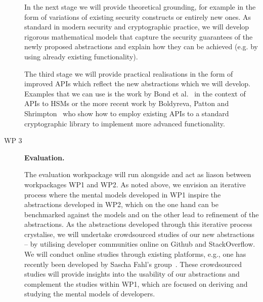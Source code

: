 \documentclass[10pt]{article}
\begin{document}
\begin{description}
In the next stage we will provide theoretical grounding, for example in the form of variations of existing security constructs or entirely new ones.  As standard in modern security and cryptographic practice, we will develop rigorous mathematical models that capture the security guarantees of the newly proposed abstractions and explain how they can be achieved (e.g. by using already existing functionality).  


 The third stage we will provide practical realisations in the form of improved APIs which reflect the new abstractions which we will develop.  
Examples that we can use is the work by Bond et al.~\cite{bond2013low} in the context of APIs to HSMs or the more recent work by Boldyreva, Patton and Shrimpton~\cite{C:BolPatShr17} who show how to employ existing APIs to a standard cryptographic library to implement more advanced functionality.
\vspace{.3cm}
\iffalse
Technically, we will provide wrappers to some of the most commonly used libraries.  
We remark that improved APIs is one of the feature of the NaCl cryptographic library~\cite{bernstein}; currently that library only considers lower level primitives.  
\fi



\vspace{-\baselineskip}

\vspace{.3cm}

\item[WP 3] \textbf{Evaluation.}

The evaluation workpackage will run alongside and act as liason between workpackages WP1 and WP2.  
As noted above, we envision an iterative process where the mental models developed in WP1 inspire the abstractions developed in WP2, which on the one hand can be benchmarked against the models and on the other lead to refinement of the abstractions. As the abstractions developed through this iterative process crystalise, we will undertake crowdsourced studies of our new abstractions -- by utilising developer communities online on Github and StackOverflow. We will conduct online studies through existing platforms, e.g., one has recently been developed by Sascha Fahl's group~\cite{stransky2017}. These crowdsourced studies will provide insights into the usability of our abstractions and complement the studies within WP1, which are focused on deriving and studying the mental models of developers. 

\end{description}
\end{document}
